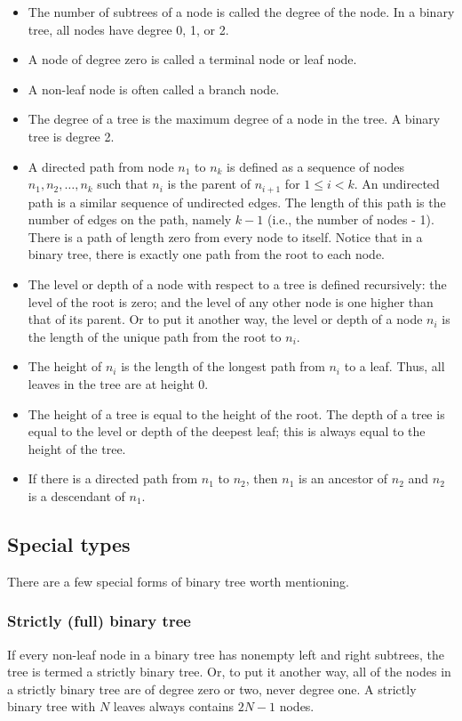 \documentclass{report}
\begin{document}
    \begin{itemize}
        \item The number of subtrees of a node is called the degree of the node. In a binary tree, all nodes have degree 0, 1, or 2.
        \item A node of degree zero is called a terminal node or leaf node.
        \item A non-leaf node is often called a branch node.
        \item The degree of a tree is the maximum degree of a node in the tree. A binary tree is degree 2.
        \item A directed path from node $n_1$ to $n_k$ is defined as a sequence of nodes $n_1, n_2, \ldots, n_k$ such that $n_i$ is the parent of $n_{i+1}$ for $1 \leq i < k$. An undirected path is a similar sequence of undirected edges. The length of this path is the number of edges on the path, namely $k - 1$ (i.e., the number of nodes - 1). There is a path of length zero from every node to itself. Notice that in a binary tree, there is exactly one path from the root to each node.
        \item The level or depth of a node with respect to a tree is defined recursively: the level of the root is zero; and the level of any other node is one higher than that of its parent. Or to put it another way, the level or depth of a node $n_i$ is the length of the unique path from the root to $n_i$.
        \item The height of $n_i$ is the length of the longest path from $n_i$ to a leaf. Thus, all leaves in the tree are at height 0.
        \item The height of a tree is equal to the height of the root. The depth of a tree is equal to the level or depth of the deepest leaf; this is always equal to the height of the tree.
        \item If there is a directed path from $n_1$ to $n_2$, then $n_1$ is an ancestor of $n_2$ and $n_2$ is a descendant of $n_1$.
    \end{itemize}
    \bigbreak \noindent 
    \subsection{Special types}
    \bigbreak \noindent 
    There are a few special forms of binary tree worth mentioning.
    \subsubsection{Strictly (full) binary tree}
    \bigbreak \noindent 
    If every non-leaf node in a binary tree has nonempty left and right subtrees, the tree is termed a strictly binary tree. Or, to put it another way, all of the nodes in a strictly binary tree are of degree zero or two, never degree one. A strictly binary tree with $N$ leaves always contains $2N-1 $ nodes.
    \bigbreak \noindent 
\end{document}
